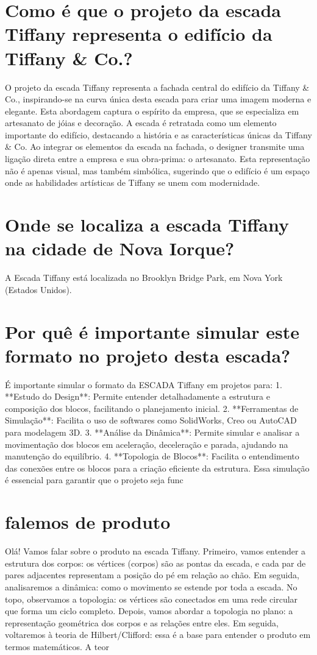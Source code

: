 \documentclass[11pt,a4paper]{article}
\begin{document}
\section{Como é que o projeto da escada Tiffany representa o edifício da Tiffany \& Co.?}
O projeto da escada Tiffany representa a fachada central do edifício da Tiffany \& Co., inspirando-se na curva única desta escada para criar uma imagem moderna e elegante. Esta abordagem captura o espírito da empresa, que se especializa em artesanato de jóias e decoração. A escada é retratada como um elemento importante do edifício, destacando a história e as características únicas da Tiffany \& Co. Ao integrar os elementos da escada na fachada, o designer transmite uma ligação direta entre a empresa e sua obra-prima: o artesanato. Esta representação não é apenas visual, mas também simbólica, sugerindo que o edifício é um espaço onde as habilidades artísticas de Tiffany se unem com modernidade.

\section{Onde se localiza a escada Tiffany na cidade de Nova Iorque?}
A Escada Tiffany está localizada no Brooklyn Bridge Park, em Nova York (Estados Unidos).

\section{Por quê é importante simular este formato no projeto desta escada?}
É importante simular o formato da ESCADA Tiffany em projetos para: 1. **Estudo do Design**: Permite entender detalhadamente a estrutura e composição dos blocos, facilitando o planejamento inicial. 2. **Ferramentas de Simulação**: Facilita o uso de softwares como SolidWorks, Creo ou AutoCAD para modelagem 3D. 3. **Análise da Dinâmica**: Permite simular e analisar a movimentação dos blocos em aceleração, deceleração e parada, ajudando na manutenção do equilíbrio. 4. **Topologia de Blocos**: Facilita o entendimento das conexões entre os blocos para a criação eficiente da estrutura. Essa simulação é essencial para garantir que o projeto seja func

\section{falemos de produto}
Olá! Vamos falar sobre o produto na escada Tiffany. Primeiro, vamos entender a estrutura dos corpos: os vértices (corpos) são as pontas da escada, e cada par de pares adjacentes representam a posição do pé em relação ao chão. Em seguida, analisaremos a dinâmica: como o movimento se estende por toda a escada. No topo, observamos a topologia: os vértices são conectados em uma rede circular que forma um ciclo completo. Depois, vamos abordar a topologia no plano: a representação geométrica dos corpos e as relações entre eles. Em seguida, voltaremos à teoria de Hilbert/Clifford: essa é a base para entender o produto em termos matemáticos. A teor
\end{document}
